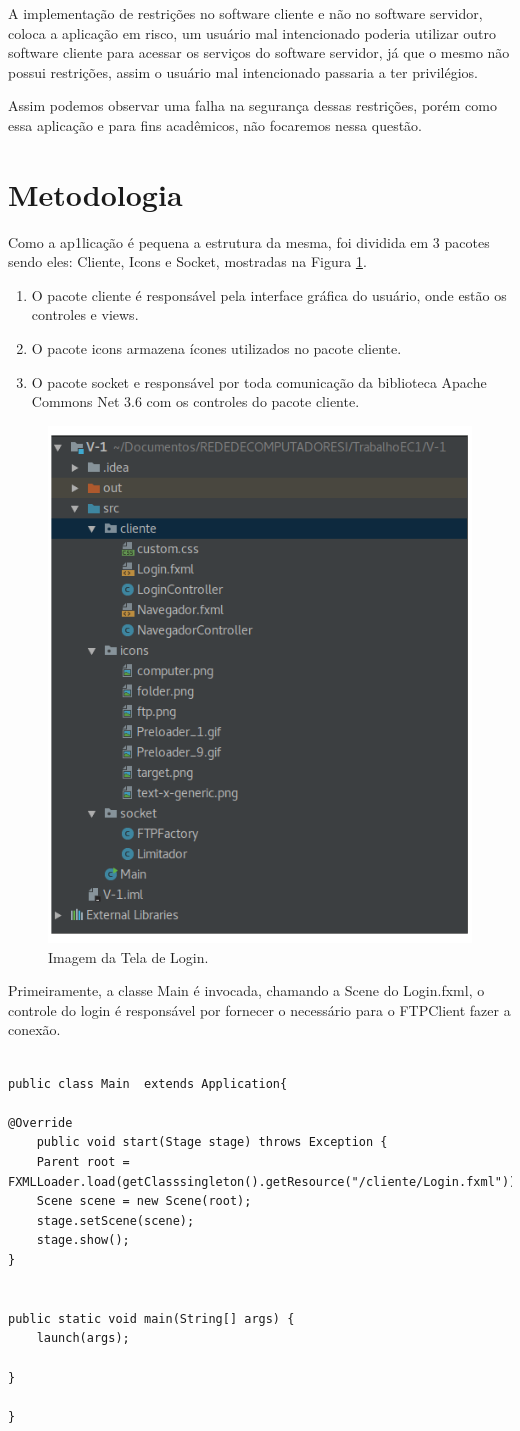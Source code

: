 \documentclass[12pt]{article}
\begin{document}
A implementação de restrições no software cliente e não no software servidor, coloca a aplicação em risco, um usuário mal intencionado poderia utilizar outro software cliente para acessar os serviços do software servidor, já que o mesmo não possui restrições, assim o usuário mal intencionado passaria a ter privilégios.\cite{rocha2001qualidade}

Assim podemos observar uma falha na segurança dessas restrições, porém como essa aplicação e para fins acadêmicos, não focaremos nessa questão.


\section{Metodologia}
Como a ap1licação é pequena a estrutura da mesma, foi dividida em 3 pacotes sendo eles: Cliente, Icons e Socket, mostradas na Figura \ref{fig:01}.

\begin{enumerate}
	
\item{O pacote cliente é responsável pela interface gráfica do usuário, onde estão os controles e views.}
\item{O pacote icons armazena ícones utilizados no pacote cliente.}
\item{O pacote socket e responsável por toda comunicação da biblioteca Apache Commons Net 3.6 com os controles do pacote cliente.}

\end{enumerate}

\begin{figure}[H]
	\centering
	\includegraphics[width=.3\textwidth]{Imagens/001.png}
	\caption{ Imagem da Tela de Login.}
	\label{fig:01}
\end{figure}


Primeiramente, a classe Main é invocada, chamando a Scene do Login.fxml, o controle do login é responsável por fornecer o necessário para o FTPClient fazer a conexão.

\begin{lstlisting}

public class Main  extends Application{

@Override
	public void start(Stage stage) throws Exception {
	Parent root = FXMLLoader.load(getClasssingleton().getResource("/cliente/Login.fxml"));
	Scene scene = new Scene(root);
	stage.setScene(scene);
	stage.show();
}


public static void main(String[] args) {
	launch(args);

}

}

\end{lstlisting}
\end{document}
